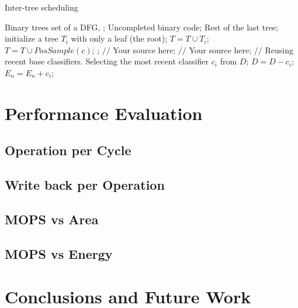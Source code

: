 \documentclass[12pt]{article}
\begin{document}
\begin{CJK}{UTF8}{bkai}
\begin{algorithm}[h]
  \caption{Inter-tree scheduling}
  \begin{algorithmic}[1]
        \Require 
            Binary trees set of a DFG, ;    
        \Ensure 
            Uncompleted binary code; Rest of the last tree;
      \State initialize a tree $T_{i}$ with only a leaf (the root);
      \State $T=T\cup T_{i};$
    \EndFor
      \label{code:TrainBase:getc}
      \State $T=T\cup PosSample(c)$;
      \label{code:TrainBase:pos}
    \EndFor;
      \State $//$ Your source here;
    \EndFor
      \State $//$ Your source here;
    \EndFor
    \State $//$ Reusing recent base classifiers.
    \label{code:recentStart}
      \State Selecting the most recent classifier $c_i$ from $D$;
      \State $D=D-c_i$;
      \State $E_n=E_n+c_i$;
    \EndWhile
    \label{code:recentEnd}
  \end{algorithmic}
  \label{alg:inter}
\end{algorithm}


\section{Performance Evaluation}
    \subsection{Operation per Cycle}
    \subsection{Write back per Operation}
    \subsection{MOPS vs Area}
    \subsection{MOPS vs Energy}

\section{Conclusions and Future Work}

\clearpage

\singlespacing

\printbibliography

\end{CJK}
\end{document}
